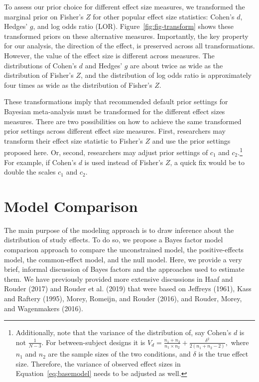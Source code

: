 \documentclass[english,,man]{apa6}
\begin{document}
To assess our prior choice for different effect size measures, we transformed the marginal prior on Fisher's \(Z\) for other popular effect size statistics: Cohen's \(d\), Hedges' \(g\), and log odds ratio (LOR). Figure~\ref{fig:fig-transform} shows these transformed priors on these alternative measures. Importantly, the key property for our analysis, the direction of the effect, is preserved across all transformations. However, the value of the effect size is different across measures. The distributions of Cohen's \(d\) and Hedges' \(g\) are about twice as wide as the distribution of Fisher's \(Z\), and the distribution of log odds ratio is approximately four times as wide as the distribution of Fisher's \(Z\).

These transformations imply that recommended default prior settings for Bayesian meta-analysis must be transformed for the different effect sizes measures. There are two possibilities on how to achieve the same transformed prior settings across different effect size measures. First, researchers may transform their effect size statistic to Fisher's \(Z\) and use the prior settings proposed here. Or, second, researchers may adjust prior settings of \(c_1\) and \(c_2\).\footnote{Additionally, note that the variance of the distribution of, say Cohen's \(d\) is not \(\frac{1}{N - 3}\). For between-subject designs it is \(V_d = \frac{n_1 + n_2}{n_1 \times n_2} + \frac{\delta^2}{2(n_1 + n_2 - 2)},\) where \(n_1\) and \(n_2\) are the sample sizes of the two conditions, and \(\delta\) is the true effect size. Therefore, the variance of observed effect sizes in Equation~\eqref{eq:basemodel} needs to be adjusted as well.} For example, if Cohen's \(d\) is used instead of Fisher's \(Z\), a quick fix would be to double the scales \(c_1\) and \(c_2\).

\hypertarget{model-comparison}{%
\section{Model Comparison}\label{model-comparison}}

The main purpose of the modeling approach is to draw inference about the distribution of study effects.
To do so, we propose a Bayes factor model comparison approach to compare the unconstrained model, the positive-effects model, the common-effect model, and the null model. Here, we provide a very brief, informal discussion of Bayes factors and the approaches used to estimate them. We have previously provided more extensive discussions in Haaf and Rouder (2017) and Rouder et al. (2019) that were based on Jeffreys (1961), Kass and Raftery (1995), Morey, Romeijn, and Rouder (2016), and Rouder, Morey, and Wagenmakers (2016).
\end{document}
